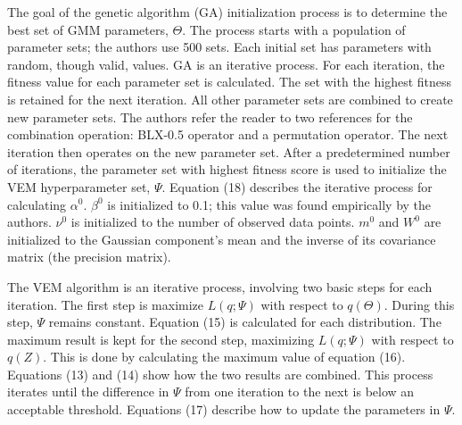 \documentclass[11pt]{article}
\begin{document}
The goal of the genetic algorithm (GA) initialization process is to determine
the best set of GMM parameters, \(\Theta\). The process starts with a population
of parameter sets; the authors use 500 sets. Each initial set has parameters
with random, though valid, values. GA is an iterative process. For each
iteration, the fitness value for each parameter set is calculated. The set with
the highest fitness is retained for the next iteration. All other parameter sets
are combined to create new parameter sets. The authors refer the reader to two
references for the combination operation: BLX-0.5 operator and a permutation
operator. The next iteration then operates on the new parameter set. After a
predetermined number of iterations, the parameter set with highest fitness score
is used to initialize the VEM hyperparameter set, \(\Psi\). Equation (18) describes the
iterative process for calculating \(\alpha^0\). \(\beta^0\) is initialized to
0.1; this value was found empirically by the authors. \(\nu^0\) is initialized
to the number of observed data points. \(m^0\) and \(W^0\) are initialized to
the Gaussian component's mean and the inverse of its covariance matrix (the
precision matrix).

The VEM algorithm is an iterative process, involving two basic steps for each
iteration. The first step is maximize \(L(q;\Psi)\) with respect to
\(q(\Theta)\). During this step, \(\Psi\) remains constant. Equation (15) is
calculated for each distribution. The maximum result is kept for the second
step, maximizing \(L(q;\Psi)\) with respect to \(q(Z)\). This is done by
calculating the maximum value of equation (16). Equations (13) and (14) show how
the two results are combined. This process iterates until the difference in
\(\Psi\) from one iteration to the next is below an acceptable threshold.
Equations (17) describe how to update the parameters in \(\Psi\).
\end{document}
